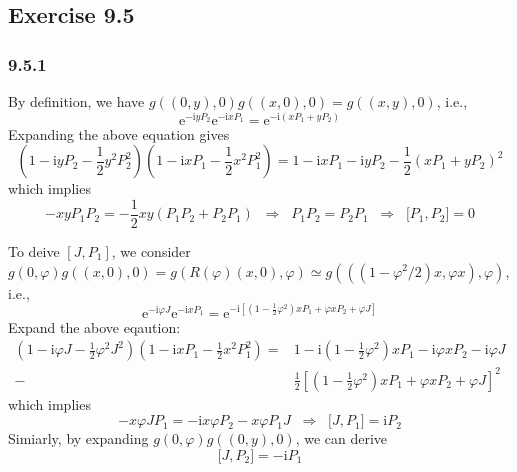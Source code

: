 \documentclass[]{ctexart}
\begin{document}
\subsection{Exercise 9.5}
\subsubsection*{9.5.1}
By definition, we have $g((0,y),0)g((x,0),0)=g((x,y),0)$, i.e.,
\begin{equation*}
\mathrm{e}^{-\mathrm{i}yP_2}\mathrm{e}^{-\mathrm{i}xP_1}=\mathrm{e}^{-\mathrm{i}(xP_1+yP_2)}
\end{equation*}
Expanding the above equation gives 
\begin{equation*}
\left(1-\mathrm{i}yP_2-\frac{1}{2}y^2P_2^2\right)\left(1-\mathrm{i}xP_1-\frac{1}{2}x^2P_1^2\right)=1-\mathrm{i}xP_1-\mathrm{i}yP_2-\frac{1}{2}(xP_1+yP_2)^2
\end{equation*}
which implies 
\begin{equation*}
-xyP_1P_2=-\frac{1}{2}xy(P_1P_2+P_2P_1)\;\;\Rightarrow\;\;P_1P_2=P_2P_1\;\;\Rightarrow\;\;\big[P_1,P_2\big]=0
\end{equation*}

To deive $[J,P_{1}]$, we consider $g(0,\varphi)g((x,0),0)=g(R(\varphi)(x,0),\varphi)\simeq g(((1-\varphi^2/2)x,\varphi x),\varphi)$, i.e., 
\begin{equation*}
\mathrm{e}^{-\mathrm{i}\varphi J}\mathrm{e}^{-\mathrm{i}xP_1}=\mathrm{e}^{-\mathrm{i}\left[\left(1-\frac{1}{2}\varphi^2\right)xP_1+\varphi xP_2+\varphi J\right]}
\end{equation*}
Expand the above eqaution: 
\begin{align*}
\left(1-\mathrm{i}\varphi J-\frac{1}{2}\varphi^2 J^2\right)\left(1-\mathrm{i}xP_1-\frac{1}{2}x^2P_1^2\right)={}&1-\mathrm{i}\left(1-\frac{1}{2}\varphi^2\right)xP_1-\mathrm{i}\varphi xP_2-\mathrm{i}\varphi J\\
-\;&\frac{1}{2}\left[\left(1-\frac{1}{2}\varphi^2\right)xP_1+\varphi xP_2+\varphi J\right]^2
\end{align*}
which implies 
\begin{equation*}
-x\varphi JP_1=-\mathrm{i}x\varphi P_2-x\varphi P_1J\;\;\Rightarrow\;\;\big[J,P_1\big]=\mathrm{i}P_2
\end{equation*}
Simiarly, by expanding $g(0,\varphi)g((0,y),0)$, we can derive 
\begin{equation*}
\big[J,P_2\big]=-\mathrm{i}P_1
\end{equation*}
\end{document}
